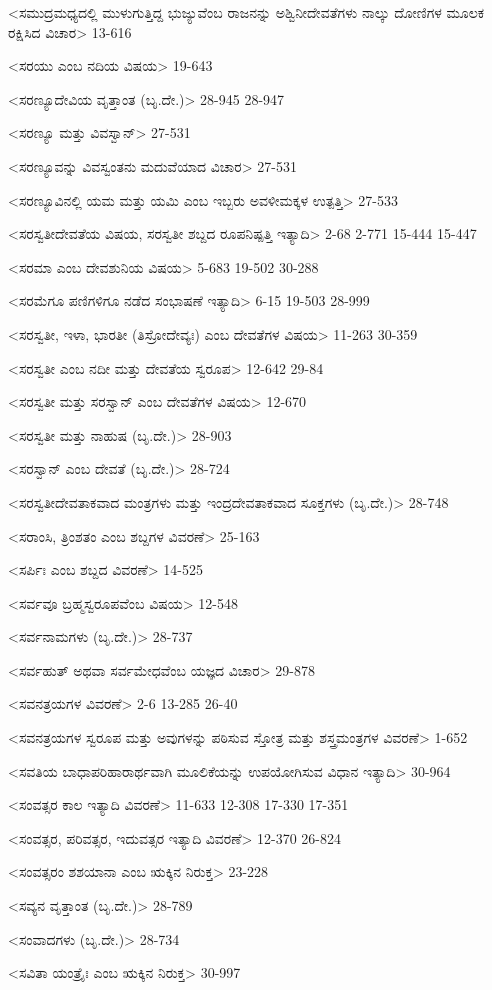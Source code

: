 <ಸಮುದ್ರಮಧ್ಯದಲ್ಲಿ ಮುಳುಗುತ್ತಿದ್ದ ಭುಜ್ಯುವೆಂಬ ರಾಜನನ್ನು ಅಶ್ವಿನೀದೇವತೆಗಳು ನಾಲ್ಕು ದೋಣಿಗಳ ಮೂಲಕ ರಕ್ಷಿಸಿದ ವಿಚಾರ>
13-616

<ಸರಯು ಎಂಬ ನದಿಯ ವಿಷಯ>
19-643

<ಸರಣ್ಯೂದೇವಿಯ ವೃತ್ತಾಂತ (ಬೃ.ದೇ.)>
28-945 
28-947

<ಸರಣ್ಯೂ ಮತ್ತು ವಿವಸ್ವಾನ್‍>
27-531

<ಸರಣ್ಯೂವನ್ನು ವಿವಸ್ವಂತನು ಮದುವೆಯಾದ ವಿಚಾರ>
27-531

<ಸರಣ್ಯೂವಿನಲ್ಲಿ ಯಮ ಮತ್ತು ಯಮಿ ಎಂಬ ಇಬ್ಬರು ಅವಳೀಮಕ್ಕಳ ಉತ್ಪತ್ತಿ>
27-533

<ಸರಸ್ವತೀದೇವತೆಯ ವಿಷಯ, ಸರಸ್ವತೀ ಶಬ್ದದ ರೂಪನಿಷ್ಪತ್ತಿ ಇತ್ಯಾದಿ>
2-68
2-771
15-444
15-447

<ಸರಮಾ ಎಂಬ ದೇವಶುನಿಯ ವಿಷಯ>
5-683 
19-502
30-288

<ಸರಮೆಗೂ ಪಣಿಗಳಿಗೂ ನಡೆದ ಸಂಭಾಷಣೆ ಇತ್ಯಾದಿ>
6-15
19-503
28-999

<ಸರಸ್ವತೀ, ಇಳಾ, ಭಾರತೀ (ತಿಸ್ರೋದೇವ್ಯಃ) ಎಂಬ ದೇವತೆಗಳ ವಿಷಯ>
11-263 
30-359

<ಸರಸ್ವತೀ ಎಂಬ ನದೀ ಮತ್ತು ದೇವತೆಯ ಸ್ವರೂಪ>
12-642
29-84

<ಸರಸ್ವತೀ ಮತ್ತು ಸರಸ್ವಾನ್‍ ಎಂಬ ದೇವತೆಗಳ ವಿಷಯ>
12-670

<ಸರಸ್ವತೀ ಮತ್ತು ನಾಹುಷ (ಬೃ.ದೇ.)>
28-903

<ಸರಸ್ವಾನ್‍ ಎಂಬ ದೇವತೆ (ಬೃ.ದೇ.)>
28-724

<ಸರಸ್ವತೀದೇವತಾಕವಾದ ಮಂತ್ರಗಳು ಮತ್ತು ಇಂದ್ರದೇವತಾಕವಾದ ಸೂಕ್ತಗಳು (ಬೃ.ದೇ.)>
28-748

<ಸರಾಂಸಿ, ತ್ರಿಂಶತಂ ಎಂಬ ಶಬ್ದಗಳ ವಿವರಣೆ>
25-163

<ಸರ್ಪಿಃ ಎಂಬ ಶಬ್ದದ ವಿವರಣೆ>
14-525

<ಸರ್ವವೂ ಬ್ರಹ್ಮಸ್ವರೂಪವೆಂಬ ವಿಷಯ>
12-548

<ಸರ್ವನಾಮಗಳು (ಬೃ.ದೇ.)>
28-737

<ಸರ್ವಹುತ್‍ ಅಥವಾ ಸರ್ವಮೇಧವೆಂಬ ಯಜ್ಞದ ವಿಚಾರ>
29-878

<ಸವನತ್ರಯಗಳ ವಿವರಣೆ>
2-6
13-285
26-40

<ಸವನತ್ರಯಗಳ ಸ್ವರೂಪ ಮತ್ತು ಅವುಗಳನ್ನು ಪಠಿಸುವ ಸ್ತೋತ್ರ ಮತ್ತು ಶಸ್ತ್ರಮಂತ್ರಗಳ ವಿವರಣೆ>
1-652

<ಸವತಿಯ ಬಾಧಾಪರಿಹಾರಾರ್ಥವಾಗಿ ಮೂಲಿಕೆಯನ್ನು ಉಪಯೋಗಿಸುವ ವಿಧಾನ ಇತ್ಯಾದಿ>
30-964

<ಸಂವತ್ಸರ ಕಾಲ ಇತ್ಯಾದಿ ವಿವರಣೆ>
11-633 
12-308
17-330
17-351

<ಸಂವತ್ಸರ, ಪರಿವತ್ಸರ, ಇದುವತ್ಸರ ಇತ್ಯಾದಿ ವಿವರಣೆ>
12-370
26-824

<ಸಂವತ್ಸರಂ ಶಶಯಾನಾ ಎಂಬ ಋಕ್ಕಿನ ನಿರುಕ್ತ>
23-228

<ಸವ್ಯನ ವೃತ್ತಾಂತ (ಬೃ.ದೇ.)>
28-789

<ಸಂವಾದಗಳು (ಬೃ.ದೇ.)>
28-734

<ಸವಿತಾ ಯಂತ್ರೈಃ ಎಂಬ ಋಕ್ಕಿನ ನಿರುಕ್ತ>
30-997

